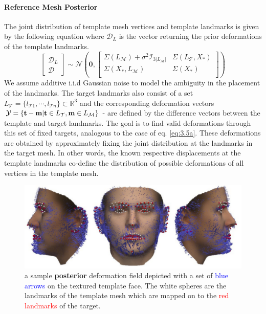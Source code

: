 \paragraph{Reference Mesh Posterior}
The joint distribution of template mesh vertices and template landmarks is given by the following equation where $\mathcal{D}_{L}$ is the vector returning the prior deformations of the template landmarks. 
\begin{equation}
    \begin{bmatrix}\mathcal{D}_{L}\\\mathcal{D}\end{bmatrix}
\sim \mathcal{N}\left(\textbf{0},
\begin{bmatrix}
    \Sigma(L_{\mathcal{M}}) + \sigma^2\mathcal{I}_{3\left|L_{\mathcal{M}} \right|} & \Sigma(L_{\mathcal{T}},X_{*})\\
    \Sigma(X_{*},L_{\mathcal{M}}) & \Sigma(X_{*})\\
\end{bmatrix}
\right)
\end{equation}
We assume additive i.i.d Gaussian noise to model the ambiguity in the placement of the landmarks. The target landmarks also consist of a set $L_{\mathcal{T}} = \{l_{\mathcal{T}1},\cdots, l_{\mathcal{T}n}\} \subset \mathbb{R}^3$ and the corresponding deformation vectors $\mathcal{Y}=\{\textbf{t}-\textbf{m}\vert \textbf{t} \in L_{\mathcal{T}}, \textbf{m} \in L_{\mathcal{M}}\}$ - are defined by the difference vectors between the template and target landmarks. The goal is to find valid
deformations through this set of fixed targets, analogous to the case of eq. \ref{eq:3.5a}. These deformations are obtained by approximately fixing the joint distribution at the landmarks in the target mesh. In other words, the known respective displacements at the template landmarks co-define the distribution of possible deformations of all vertices in the template mesh.
\begin{figure}[h!]
    \includegraphics[width=\textwidth]{./resources/img/posterior_deformations.pdf}
    \caption{a sample \textbf{posterior} deformation field depicted with a set of \textcolor{blue}{blue arrows} on the textured template face. The white spheres are the landmarks of the template mesh which are mapped on to the \textcolor{red}{red landmarks} of the target.}
\label{fig:posteriordeformations}
\end{figure}
